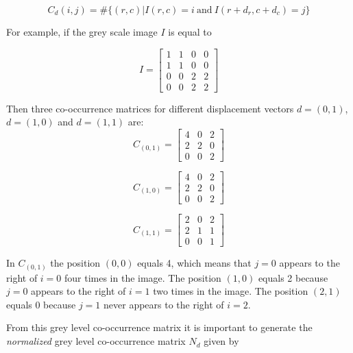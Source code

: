 \begin{equation}
    C_{d}(i,j) = \# \{(r,c) | I(r,c)=i\  \text{and} \  I(r+d_r, c+d_c)=j \} 
\end{equation}

For example, if the grey scale image $I$ is equal to

\begin{equation}
I=
    \begin{bmatrix}
    1&1&0&0\\
    1&1&0&0\\
    0&0&2&2\\
    0&0&2&2
    \end{bmatrix} 
\end{equation}{}


Then three co-occurrence matrices for different displacement vectors $d=(0,1)$, $d=(1,0)$ and $d=(1,1)$ are:
\begin{equation}
    C_{(0,1)}=
    \begin{bmatrix}
    4&0&2\\
    2&2&0\\
    0&0&2
    \end{bmatrix}
\end{equation}{}

\begin{equation}
C_{(1,0)}=
    \begin{bmatrix}
    4&0&2\\
    2&2&0\\
    0&0&2
    \end{bmatrix}
\end{equation}{}

\begin{equation}
C_{(1,1)}=
    \begin{bmatrix}
    2&0&2\\
    2&1&1\\
    0&0&1
    \end{bmatrix}
\end{equation}{}

In $C_{(0,1)}$ the position $(0,0)$ equals 4, which means that $j=0$ appears to the right of $i=0$ four times in the image. The position $(1,0)$ equals 2 because $j=0$ appears to the right of $i=1$ two times in the image. The position $(2,1)$ equals 0 because $j=1$ never appears to the right of $i=2$.

From this grey level co-occurrence matrix it is important to generate the \textit{normalized} grey level co-occurrence matrix $N_d$ given by

